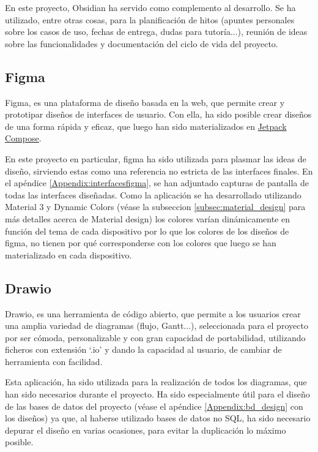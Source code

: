 En este proyecto, Obsidian ha servido como complemento al desarrollo. Se ha utilizado, entre otras cosas, para la planificación de hitos (apuntes personales sobre los casos de uso, fechas de entrega, dudas para tutoría...), reunión de ideas sobre las funcionalidades y documentación del ciclo de vida del proyecto.

\hypertarget{subsec:figma}{}
\subsection{Figma}
Figma\hyperlink{cap:biblio}{}, es una plataforma de diseño basada en la web, que permite crear y prototipar diseños de interfaces de usuario. Con ella, ha sido posible crear diseños de una forma rápida y eficaz, que luego han sido materializados en \hyperlink{subsec:compose}{Jetpack Compose}. 

En este proyecto en particular, figma ha sido utilizada para plasmar las ideas de diseño, sirviendo estas como una referencia no estricta de las interfaces finales. En el apéndice \ref{Appendix:interfacesfigma}, se han adjuntado capturas de pantalla de todas las interfaces diseñadas. Como la aplicación se ha desarrollado utilizando 
Material 3\hyperlink{cap:biblio}{} y Dynamic Colors (véase la subseccion \ref{subsec:material_design} para más detalles acerca de Material design) los colores varían dinámicamente en función del tema de cada dispositivo por lo que los colores de los diseños de figma, no tienen por qué corresponderse con los colores que luego se han materializado en cada dispositivo.
\hypertarget{subsec:drawio}{}
\subsection{Drawio}
Drawio\hyperlink{cap:biblio}{}, es una herramienta de código abierto, que permite a los usuarios crear una amplia variedad de diagramas (flujo, Gantt...), seleccionada para el proyecto por ser cómoda, personalizable y con gran capacidad de portabilidad, utilizando ficheros con extensión ‘.io’ y dando la capacidad al usuario, de cambiar de herramienta con facilidad. 

Esta aplicación, ha sido utilizada para la realización de todos los diagramas, que han sido necesarios durante el proyecto. Ha sido especialmente útil para el diseño de las bases de datos del proyecto (véase el apéndice \ref{Appendix:bd_design} con los diseños) ya que, al haberse utilizado bases de datos no SQL, ha sido necesario depurar el diseño en varias ocasiones, para evitar la duplicación lo máximo posible.

